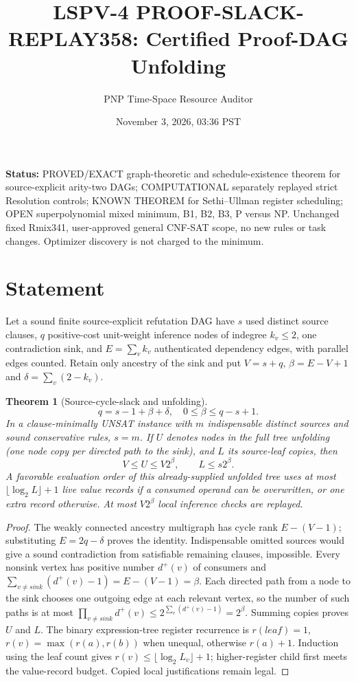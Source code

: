 \documentclass[11pt]{article}
\title{LSPV-4 PROOF-SLACK-REPLAY358: Certified Proof-DAG Unfolding}
\author{PNP Time-Space Resource Auditor}
\date{November 3, 2026, 03:36 PST}
\newtheorem{theorem}{Theorem}
\begin{document}
\maketitle
\noindent\textbf{Status:} PROVED/EXACT graph-theoretic and schedule-existence theorem for source-explicit arity-two DAGs; COMPUTATIONAL separately replayed strict Resolution controls; KNOWN THEOREM for Sethi--Ullman register scheduling; OPEN superpolynomial mixed minimum, B1, B2, B3, P versus NP. Unchanged fixed Rmix341, user-approved general CNF-SAT scope, no new rules or task changes. Optimizer discovery is not charged to the minimum.

\section*{Statement}
Let a sound finite source-explicit refutation DAG have $s$ used distinct source clauses, $q$ positive-cost unit-weight inference nodes of indegree $k_v\le2$, one contradiction sink, and $E=\sum_v k_v$ authenticated dependency edges, with parallel edges counted. Retain only ancestry of the sink and put $V=s+q$, $\beta=E-V+1$ and $\delta=\sum_v(2-k_v)$.
\begin{theorem}[Source-cycle-slack and unfolding]
\[
\boxed{q=s-1+\beta+\delta,\quad 0\le\beta\le q-s+1.}
\]
In a clause-minimally UNSAT instance with $m$ indispensable distinct sources and sound conservative rules, $s=m$. If $U$ denotes nodes in the full tree unfolding (one node copy per directed path to the sink), and $L$ its source-leaf copies, then
\[
\boxed{V\le U\le V2^\beta,\qquad L\le s2^\beta.}
\]
A favorable evaluation order of this already-supplied unfolded tree uses at most $\lfloor\log_2 L\rfloor+1$ live value records if a consumed operand can be overwritten, or one extra record otherwise. At most $V2^\beta$ local inference checks are replayed.
\end{theorem}
\begin{proof}
The weakly connected ancestry multigraph has cycle rank $E-(V-1)$; substituting $E=2q-\delta$ proves the identity. Indispensable omitted sources would give a sound contradiction from satisfiable remaining clauses, impossible. Every nonsink vertex has positive number $d^+(v)$ of consumers and $\sum_{v\ne sink}(d^+(v)-1)=E-(V-1)=\beta$. Each directed path from a node to the sink chooses one outgoing edge at each relevant vertex, so the number of such paths is at most $\prod_{v\ne sink}d^+(v)\le2^{\sum_v(d^+(v)-1)}=2^\beta$. Summing copies proves $U$ and $L$. The binary expression-tree register recurrence is $r(leaf)=1$, $r(v)=\max(r(a),r(b))$ when unequal, otherwise $r(a)+1$. Induction using the leaf count gives $r(v)\le\lfloor\log_2 L_v\rfloor+1$; higher-register child first meets the value-record budget. Copied local justifications remain legal.
\end{proof}
\end{document}
